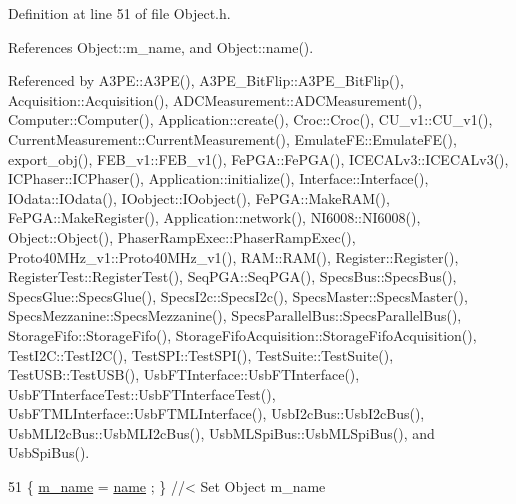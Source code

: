 Definition at line 51 of file Object.\+h.



References Object\+::m\+\_\+name, and Object\+::name().



Referenced by A3\+P\+E\+::\+A3\+P\+E(), A3\+P\+E\+\_\+\+Bit\+Flip\+::\+A3\+P\+E\+\_\+\+Bit\+Flip(), Acquisition\+::\+Acquisition(), A\+D\+C\+Measurement\+::\+A\+D\+C\+Measurement(), Computer\+::\+Computer(), Application\+::create(), Croc\+::\+Croc(), C\+U\+\_\+v1\+::\+C\+U\+\_\+v1(), Current\+Measurement\+::\+Current\+Measurement(), Emulate\+F\+E\+::\+Emulate\+F\+E(), export\+\_\+obj(), F\+E\+B\+\_\+v1\+::\+F\+E\+B\+\_\+v1(), Fe\+P\+G\+A\+::\+Fe\+P\+G\+A(), I\+C\+E\+C\+A\+Lv3\+::\+I\+C\+E\+C\+A\+Lv3(), I\+C\+Phaser\+::\+I\+C\+Phaser(), Application\+::initialize(), Interface\+::\+Interface(), I\+Odata\+::\+I\+Odata(), I\+Oobject\+::\+I\+Oobject(), Fe\+P\+G\+A\+::\+Make\+R\+A\+M(), Fe\+P\+G\+A\+::\+Make\+Register(), Application\+::network(), N\+I6008\+::\+N\+I6008(), Object\+::\+Object(), Phaser\+Ramp\+Exec\+::\+Phaser\+Ramp\+Exec(), Proto40\+M\+Hz\+\_\+v1\+::\+Proto40\+M\+Hz\+\_\+v1(), R\+A\+M\+::\+R\+A\+M(), Register\+::\+Register(), Register\+Test\+::\+Register\+Test(), Seq\+P\+G\+A\+::\+Seq\+P\+G\+A(), Specs\+Bus\+::\+Specs\+Bus(), Specs\+Glue\+::\+Specs\+Glue(), Specs\+I2c\+::\+Specs\+I2c(), Specs\+Master\+::\+Specs\+Master(), Specs\+Mezzanine\+::\+Specs\+Mezzanine(), Specs\+Parallel\+Bus\+::\+Specs\+Parallel\+Bus(), Storage\+Fifo\+::\+Storage\+Fifo(), Storage\+Fifo\+Acquisition\+::\+Storage\+Fifo\+Acquisition(), Test\+I2\+C\+::\+Test\+I2\+C(), Test\+S\+P\+I\+::\+Test\+S\+P\+I(), Test\+Suite\+::\+Test\+Suite(), Test\+U\+S\+B\+::\+Test\+U\+S\+B(), Usb\+F\+T\+Interface\+::\+Usb\+F\+T\+Interface(), Usb\+F\+T\+Interface\+Test\+::\+Usb\+F\+T\+Interface\+Test(), Usb\+F\+T\+M\+L\+Interface\+::\+Usb\+F\+T\+M\+L\+Interface(), Usb\+I2c\+Bus\+::\+Usb\+I2c\+Bus(), Usb\+M\+L\+I2c\+Bus\+::\+Usb\+M\+L\+I2c\+Bus(), Usb\+M\+L\+Spi\+Bus\+::\+Usb\+M\+L\+Spi\+Bus(), and Usb\+Spi\+Bus().


\begin{DoxyCode}
51 \{ \hyperlink{classObject_a8b83c95c705d2c3ba0d081fe1710f48d}{m\_name}  = \hyperlink{classObject_a300f4c05dd468c7bb8b3c968868443c1}{name}  ; \} \textcolor{comment}{//< Set Object m\_name}
\end{DoxyCode}
\mbox{\label{classHierarchy_a585ad1aeec16077a0e532ab8b4fc557b}} 
